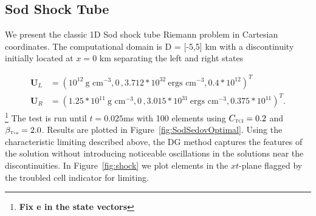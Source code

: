 \documentclass[onecolumn]{aastex62}
\newcommand{\TVD}{\textnormal{\tiny\textsc{Tvd}}}
\newcommand{\TCI}{\textnormal{\tiny\textsc{TCI}}}
\begin{document}
\subsection{Sod Shock Tube}
We present the classic 1D Sod shock tube Riemann problem \citep{sod:1978} in
Cartesian coordinates. The computational domain is D = [-5,5] km
with a discontinuity initially located at $x = 0$ km separating the left and right states

\begin{align}
  \mathbf{U}_{L} &= (10^{12}~\text{g~cm}^{-3}, 0\,, 3.712*10^{32}~\text{ergs~cm}^{-3}, 0.4*10^{12})^T\,\,\, \\
  \mathbf{U}_{R} &= (1.25*10^{11}~\text{g~cm}^{-3}, 0\, , 3.015*10^{31}~\text{ergs~cm}^{-3}, 0.375*10^{11})^T.
\end{align}
\footnote{\textbf{Fix e in the state vectors}}
\noindent The test is run until $t = 0.025$ms with 100 elements
using $C_{\TCI} = 0.2$ and $\beta_{\TVD} = 2.0$. Results are plotted in
Figure~\ref{fig:SodSedovOptimal}. Using the characteristic limiting described
above, the DG method captures the features of the solution without introducing
noticeable oscillations in the solutions near the discontinuities. In Figure~\ref{fig:shock}
we plot elements in the $xt$-plane flagged by the troubled cell indicator for
limiting.
\end{document}
